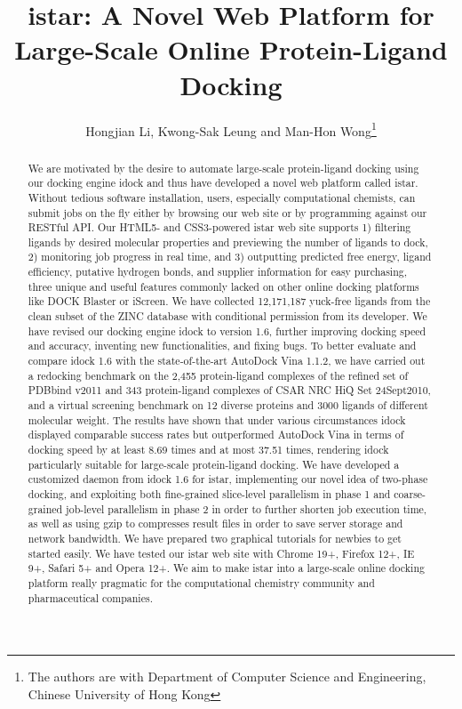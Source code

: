 \documentclass[12pt]{article}
\title{istar: A Novel Web Platform for Large-Scale Online Protein-Ligand Docking}
\author{Hongjian Li, Kwong-Sak Leung and Man-Hon Wong\thanks{The authors are with Department of Computer Science and Engineering, Chinese University of Hong Kong}}
\begin{document}
\maketitle

\begin{abstract}
We are motivated by the desire to automate large-scale protein-ligand docking using our docking engine idock and thus have developed a novel web platform called istar. Without tedious software installation, users, especially computational chemists, can submit jobs on the fly either by browsing our web site or by programming against our RESTful API. Our HTML5- and CSS3-powered istar web site supports 1) filtering ligands by desired molecular properties and previewing the number of ligands to dock, 2) monitoring job progress in real time, and 3) outputting predicted free energy, ligand efficiency, putative hydrogen bonds, and supplier information for easy purchasing, three unique and useful features commonly lacked on other online docking platforms like DOCK Blaster or iScreen. We have collected 12,171,187 yuck-free ligands from the clean subset of the ZINC database with conditional permission from its developer. We have revised our docking engine idock to version 1.6, further improving docking speed and accuracy, inventing new functionalities, and fixing bugs. To better evaluate and compare idock 1.6 with the state-of-the-art AutoDock Vina 1.1.2, we have carried out a redocking benchmark on the 2,455 protein-ligand complexes of the refined set of PDBbind v2011 and 343 protein-ligand complexes of CSAR NRC HiQ Set 24Sept2010, and a virtual screening benchmark on 12 diverse proteins and 3000 ligands of different molecular weight. The results have shown that under various circumstances idock displayed comparable success rates but outperformed AutoDock Vina in terms of docking speed by at least 8.69 times and at most 37.51 times, rendering idock particularly suitable for large-scale protein-ligand docking. We have developed a customized daemon from idock 1.6 for istar, implementing our novel idea of two-phase docking, and exploiting both fine-grained slice-level parallelism in phase 1 and coarse-grained job-level parallelism in phase 2 in order to further shorten job execution time, as well as using gzip to compresses result files in order to save server storage and network bandwidth. We have prepared two graphical tutorials for newbies to get started easily. We have tested our istar web site with Chrome 19+, Firefox 12+, IE 9+, Safari 5+ and Opera 12+. We aim to make istar into a large-scale online docking platform really pragmatic for the computational chemistry community and pharmaceutical companies.
\end{abstract}
\end{document}
